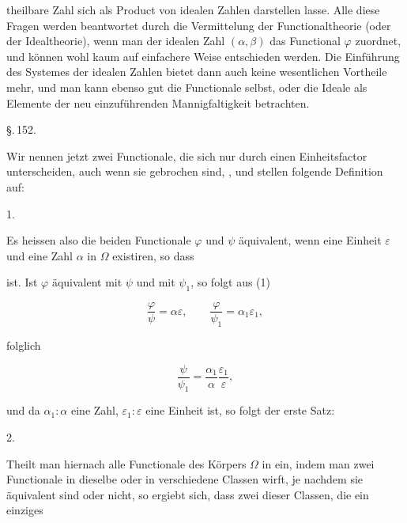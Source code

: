 theilbare Zahl sich als Product von idealen Zahlen darstellen
lasse. Alle diese Fragen werden beantwortet durch die Vermittelung
 der Functionaltheorie (oder der Idealtheorie), wenn man
der idealen Zahl $(\alpha, \beta)$ das Functional $\varphi$ zuordnet, und können
wohl kaum auf einfachere Weise entschieden werden. Die Einführung
 des Systemes der idealen Zahlen bietet dann auch keine
wesentlichen Vortheile mehr, und man kann ebenso gut die
Functionale selbst, oder die Ideale als Elemente der neu einzuführenden
 Mannigfaltigkeit betrachten.

\begin{center}
\S.\,152.

\end{center}

Wir nennen jetzt zwei Functionale, die sich nur durch einen
Einheitsfactor unterscheiden, auch wenn sie gebrochen sind,
, und stellen folgende Definition auf:

1. 

Es heissen also die beiden Functionale $\varphi$ und $\psi$ äquivalent,
wenn eine Einheit $\varepsilon$ und eine Zahl $\alpha$ in $\Omega$ existiren, so dass


ist. Ist $\varphi$ äquivalent mit $\psi$ und mit $\psi_1$, so folgt aus (1)

\[
\frac{\varphi}{\psi} = \alpha\varepsilon, \qquad \frac{\varphi}{\psi_1} = \alpha_1\varepsilon_1,
\]

folglich

\[
\frac{\psi}{\psi_1} = \frac{\alpha_1}{\alpha} \frac{\varepsilon_1}{\varepsilon},
\]

und da $\alpha_1 : \alpha$ eine Zahl, $\varepsilon_1 : \varepsilon$ eine Einheit ist, so folgt der
erste Satz:

2. 

Theilt man hiernach alle Functionale des Körpers $\Omega$ in
 ein, indem man zwei Functionale in dieselbe oder in
verschiedene Classen wirft, je nachdem sie äquivalent sind oder
nicht, so ergiebt sich, dass zwei dieser Classen, die ein einziges
